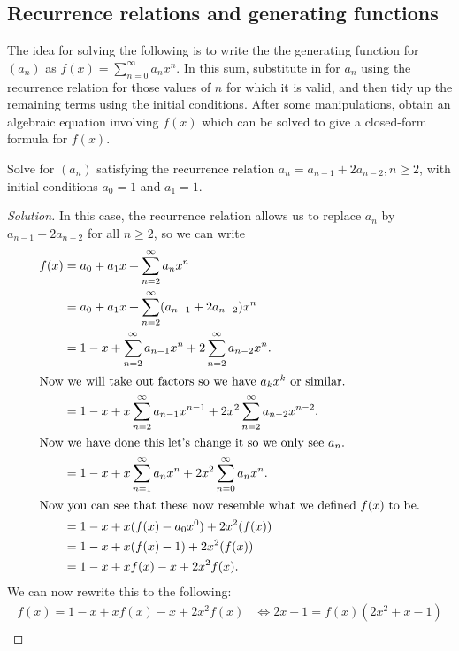\documentclass[10pt, a4paper]{article}
\begin{document}
\subsection{Recurrence relations and generating functions}

The idea for solving the following is to write the the generating function for $(a_n)$ as $f(x) = \sum_{n = 0}^{\infty}a_nx ^ n$.
In this sum,
substitute in for $a_n$ using the recurrence relation for those values of $n$ for which it is valid,
and then tidy up the remaining terms using the initial conditions.
After some manipulations,
obtain an algebraic equation involving $f(x)$ which can be solved to give a closed-form formula for $f(x)$.
\begin{example}
    Solve for $(a_n)$ satisfying the recurrence relation $a_n = a_{n - 1} + 2a_{n - 2}, n \geq 2$,
    with initial conditions $a_0 = 1$ and $a_1 = 1$.
    \begin{proof}[Solution]\renewcommand{\qedsymbol}{}
        In this case,
        the recurrence relation allows us to replace $a_n$ by $a_{n - 1} + 2a_{n - 2}$ for all $n \geq 2$,
        so we can write
        \begin{align*}
            f(x) &= a_0 + a_1x + \sum_{n = 2}^{\infty}a_nx ^ n \\
            &= a_0 + a_1x + \sum_{n = 2}^{\infty}(a_{n - 1} + 2a_{n - 2})x ^ n \\
            &= 1 - x + \sum_{n = 2}^{\infty}a_{n - 1}x ^ n + 2\sum_{n = 2}^{\infty}a_{n - 2}x ^ n. \\
            \intertext{Now we will take out factors so we have $a_{k}x ^ k$ or similar.}
            &= 1 - x + x\sum_{n = 2}^{\infty}a_{n - 1}x ^ {n - 1} + 2x ^ 2\sum_{n = 2}^{\infty}a_{n - 2}x ^ {n - 2}. \\
            \intertext{Now we have done this let's change it so we only see $a_n$.}
            &= 1 - x + x\sum_{n = 1}^{\infty}a_nx ^ {n} + 2x ^ 2\sum_{n = 0}^{\infty}a_nx ^ n. \\
            \intertext{Now you can see that these now resemble what we defined $f(x)$ to be.}
            &= 1 - x + x(f(x) - a_0x ^ 0) + 2x ^ 2(f(x)) \\
            &= 1 - x + x(f(x) - 1) + 2x ^ 2(f(x)) \\
            &= 1 - x + xf(x) - x + 2x ^ 2f(x).
        \end{align*}
        We can now rewrite this to the following:
        \begin{align*}
        f(x) = 1 - x + xf(x) - x + 2x ^ 2f(x) &\iff 2x - 1 = f(x)(2x ^ 2 + x - 1) \\

\end{align*}
\end{proof}
\end{example}
\end{document}
